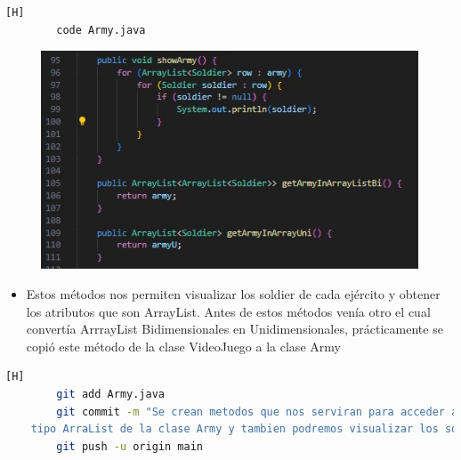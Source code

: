 \documentclass{article}
\begin{document}
	
	\begin{lstlisting}[language=bash,caption={Se crean métodos que nos permitirán acceder a los atributos de ña clase}][H]
		code Army.java
	\end{lstlisting}
	\begin{figure}[H]
		\centering
		\includegraphics[width=1\textwidth,keepaspectratio]{img/getArmy.jpg}
	\end{figure}
	\begin{itemize}	
		\item Estos métodos nos permiten visualizar los soldier de cada ejército y obtener los atributos que son ArrayList. Antes de estos métodos venía otro el cual convertía ArrrayList Bidimensionales en Unidimensionales, prácticamente se copió este método de la clase VideoJuego a la clase Army  
	\end{itemize}	
	\begin{lstlisting}[language=bash,caption={Commit: 0f87b3ab9106b3b59a30c056e21495671d0e5fa2 }][H]
		git add Army.java
		git commit -m "Se crean metodos que nos serviran para acceder al atributo que es de
	tipo ArraList de la clase Army y tambien podremos visualizar los soldier de cada ejercito"			
		git push -u origin main
	\end{lstlisting}
	
	
	
\end{document}
